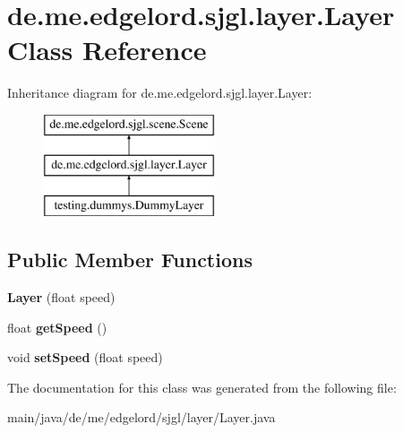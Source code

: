 \hypertarget{classde_1_1me_1_1edgelord_1_1sjgl_1_1layer_1_1_layer}{}\section{de.\+me.\+edgelord.\+sjgl.\+layer.\+Layer Class Reference}
\label{classde_1_1me_1_1edgelord_1_1sjgl_1_1layer_1_1_layer}
Inheritance diagram for de.\+me.\+edgelord.\+sjgl.\+layer.\+Layer\+:\begin{figure}[H]
\begin{center}
\leavevmode
\includegraphics[height=3.000000cm]{classde_1_1me_1_1edgelord_1_1sjgl_1_1layer_1_1_layer}
\end{center}
\end{figure}
\subsection*{Public Member Functions}
\begin{DoxyCompactItemize}
\item 
\mbox{\label{classde_1_1me_1_1edgelord_1_1sjgl_1_1layer_1_1_layer_a589405779e9bddc73c003d6252512d98}} 
{\bfseries Layer} (float speed)
\item 
\mbox{\label{classde_1_1me_1_1edgelord_1_1sjgl_1_1layer_1_1_layer_a63dbe5597f72211e83e3520891ad5bb2}} 
float {\bfseries get\+Speed} ()
\item 
\mbox{\label{classde_1_1me_1_1edgelord_1_1sjgl_1_1layer_1_1_layer_a73f93be1973d59bdf768716d27441de6}} 
void {\bfseries set\+Speed} (float speed)
\end{DoxyCompactItemize}


The documentation for this class was generated from the following file\+:\begin{DoxyCompactItemize}
\item 
main/java/de/me/edgelord/sjgl/layer/Layer.\+java\end{DoxyCompactItemize}
